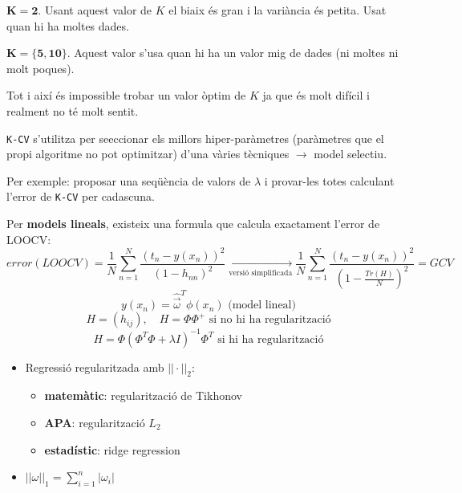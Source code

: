 \documentclass[a4paper]{article}
\begin{document}
$\boldsymbol{K=2}$. Usant aquest valor de $K$ el biaix és gran i la variància és petita. Usat quan hi ha moltes dades.

$\boldsymbol{K=\{5,10\}}$. Aquest valor s'usa quan hi ha un valor mig de dades (ni moltes ni molt poques).

Tot i així és impossible trobar un valor òptim de $K$ ja que és molt difícil i realment no té molt sentit.

\verb|K-CV| s'utilitza per se\lgem eccionar els millors hiper-paràmetres (paràmetres que el propi algoritme no pot optimitzar) d'una vàries tècniques $\rightarrow$ model selectiu.

Per exemple: proposar una seqüència de valors de $\lambda$ i provar-les totes calculant l'error de \verb|K-CV| per cadascuna.

Per \textbf{models lineals}, existeix una formula que calcula exactament l'error de LOOCV:
$$
error(LOOCV) = \frac{1}{N} \sum_{n=1}^N \frac{\left(t_n - y(x_n)\right)^2}{(1 - h_{nn})^2} \underset{\text{versió simplificada}}{\longrightarrow}
\frac{1}{N} \sum_{n=1}^N \frac{(t_n - y(x_n))^2}{\left(1 - \frac{Tr(H)}{N}\right)^2} = GCV
$$
$$
y(x_n) = \hat{\vec{\omega}}^T \phi (x_n) \text{ (model lineal)}
$$
$$
H = (h_{ij}), \quad H = \Phi \Phi^+ \text{ si no hi ha regularització}
$$
$$
H = \Phi \left( \Phi^T \Phi + \lambda I \right)^{-1} \Phi^T \text{ si hi ha regularització}
$$

\begin{itemize}
	\item Regressió regularitzada amb $||·||_2$:
	\begin{itemize}
		\item \textbf{matemàtic}: regularització de Tikhonov
		\item \textbf{APA}: regularització $L_2$
		\item \textbf{estadístic}: ridge regression
	\end{itemize}
	\item $||\omega||_1 = \sum_{i=1}^n |\omega_i|$
	
\end{itemize}
\end{document}
